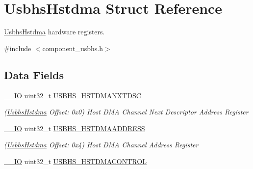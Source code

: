 \hypertarget{structUsbhsHstdma}{}\section{Usbhs\+Hstdma Struct Reference}
\label{structUsbhsHstdma}


\mbox{\hyperlink{structUsbhsHstdma}{Usbhs\+Hstdma}} hardware registers.  




{\ttfamily \#include $<$component\+\_\+usbhs.\+h$>$}

\subsection*{Data Fields}
\begin{DoxyCompactItemize}
\item 
\mbox{\label{structUsbhsHstdma_acc4fdf70eb640722863866340812b104}} 
\mbox{\hyperlink{core__cm7_8h_aec43007d9998a0a0e01faede4133d6be}{\+\_\+\+\_\+\+IO}} uint32\+\_\+t \mbox{\hyperlink{structUsbhsHstdma_acc4fdf70eb640722863866340812b104}{U\+S\+B\+H\+S\+\_\+\+H\+S\+T\+D\+M\+A\+N\+X\+T\+D\+SC}}
\begin{DoxyCompactList}\small\item\em (\mbox{\hyperlink{structUsbhsHstdma}{Usbhs\+Hstdma}} Offset\+: 0x0) Host D\+MA Channel Next Descriptor Address Register \end{DoxyCompactList}\item 
\mbox{\label{structUsbhsHstdma_aaac76fbde5905b40b7f0c559947629cf}} 
\mbox{\hyperlink{core__cm7_8h_aec43007d9998a0a0e01faede4133d6be}{\+\_\+\+\_\+\+IO}} uint32\+\_\+t \mbox{\hyperlink{structUsbhsHstdma_aaac76fbde5905b40b7f0c559947629cf}{U\+S\+B\+H\+S\+\_\+\+H\+S\+T\+D\+M\+A\+A\+D\+D\+R\+E\+SS}}
\begin{DoxyCompactList}\small\item\em (\mbox{\hyperlink{structUsbhsHstdma}{Usbhs\+Hstdma}} Offset\+: 0x4) Host D\+MA Channel Address Register \end{DoxyCompactList}\item 
\mbox{\label{structUsbhsHstdma_aec84652a60af783722179719178a1631}} 
\mbox{\hyperlink{core__cm7_8h_aec43007d9998a0a0e01faede4133d6be}{\+\_\+\+\_\+\+IO}} uint32\+\_\+t \mbox{\hyperlink{structUsbhsHstdma_aec84652a60af783722179719178a1631}{U\+S\+B\+H\+S\+\_\+\+H\+S\+T\+D\+M\+A\+C\+O\+N\+T\+R\+OL}}

\end{DoxyCompactItemize}
